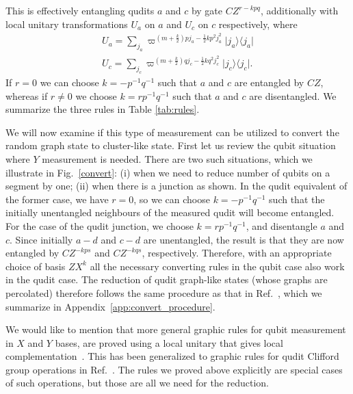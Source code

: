 \documentclass[aps,amsfonts,pra,twocolumn,showpacs]{revtex4-1}
\def\bra#1{\langle#1\vert}
\def\ket#1{\vert#1\rangle}
\begin{document}
	This is effectively entangling qudits $a$ and $c$ by gate $CZ^{r-kpq}$, additionally with local unitary transformations $U_a$ on $a$ and $U_c$ on $c$ respectively, where
		\begin{align}
		U_a = \sum_{j_a} \varpi^{(m+\frac{k}{2})pj_a-\frac{1}{2}kp^2j_a^2} \ket{j_a} \bra{j_a} \\
		U_c = \sum_{j_c} \varpi^{(m+\frac{k}{2})qj_c-\frac{1}{2}kq^2j_c^2} \ket{j_c} \bra{j_c}.
		\end{align}
	If $r=0$ we can choose $k=-p^{-1}q^{-1}$ such that $a$ and $c$ are entangled by $CZ$, whereas if $r\neq0$ we choose $k=rp^{-1}q^{-1}$ such that $a$ and $c$ are disentangled. We summarize the three rules in Table \ref{tab:rules}.

	We will now examine if this type of measurement can be utilized to convert the random graph state to cluster-like state. First let us review the qubit situation where $Y$ measurement is needed. There are two such situations, which we illustrate in Fig.~\ref{convert}: (i) when we need to reduce number of qubits on a segment by one; (ii) when there is a junction as shown. In the qudit equivalent of the former case, we have $r=0$, so we can choose $k=-p^{-1}q^{-1}$ such that the initially unentangled neighbours of the measured qudit will become entangled. For the case of the qudit junction, we choose $k=rp^{-1}q^{-1}$, and disentangle $a$ and $c$. Since initially $a-d$ and $c-d$ are unentangled, the result is that they are now entangled by $CZ^{-kps}$ and $CZ^{-kqs}$, respectively. Therefore, with an appropriate choice of basis $ZX^k$ all the necessary converting rules in the qubit case also work in the qudit case. The reduction of qudit graph-like states (whose graphs are percolated) therefore follows the same procedure as that in Ref.~\cite{Wei2012}, which we summarize in Appendix~\ref{app:convert_procedure}.
	
	We would like to mention that more general graphic rules for qubit measurement in $X$ and $Y$ bases, are proved using a local unitary that gives local complementation~\cite{Hein2006}. This has been generalized to graphic rules for qudit Clifford group operations in Ref.~\cite{Bahramgiri2007}. The rules we proved above explicitly are special cases of such operations, but those are all we need for the reduction.
	
\end{document}
